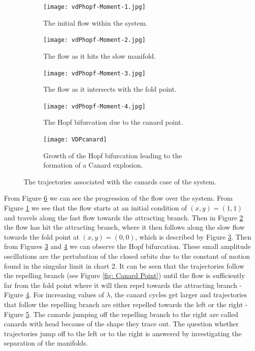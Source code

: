 \begin{figure}[h!]
	\centering
	\begin{subfigure}[t]{0.45\textwidth}
		\centering
		\texttt{[image: vdPhopf-Moment-1.jpg]}
		\caption{The initial flow within the system.} \label{fig:timing1}
	\end{subfigure}
	\hfill
	\begin{subfigure}[t]{0.45\textwidth}
		\centering
		\texttt{[image: vdPhopf-Moment-2.jpg]}
		\caption{The flow as it hits the slow manifold.} \label{fig:timing2}
	\end{subfigure}
	
	\vspace{1cm}
	\begin{subfigure}[t]{0.45\textwidth}
		\centering
		\texttt{[image: vdPhopf-Moment-3.jpg]}
		\caption{The flow as it intersects with the fold point.} \label{fig:timing3}
	\end{subfigure}
	\hfill
	\begin{subfigure}[t]{0.45\textwidth}\centering
		\texttt{[image: vdPhopf-Moment-4.jpg]}
		\caption{The Hopf bifurcation due to the canard point.}\label{fig:timing4}
	\end{subfigure}\vspace{1cm}
	\begin{subfigure}[t]{0.45\textwidth}\centering
		\texttt{[image: VDPcanard]}
		\caption{Growth of the Hopf bifurcation leading to the formation of a Canard explosion.}
		\label{fig: hopf growth}
	\end{subfigure}
	\caption{The trajectories associated with the canards case of the \vdp system.}
	\label{fig: 4 canard }
\end{figure}\newpage
From Figure \ref{fig: 4 canard } we can see the progression of the flow over the system. From Figure \ref{fig:timing1} we see that the flow starts at an initial condition of $ (x,y)=(1,1) $ and travels along the fast flow towards the attracting branch. Then in Figure \ref{fig:timing2} the flow has hit the attracting branch, where it then follows along the slow flow towards the fold point at $ (x,y)=(0,0) $, which is described by Figure \ref{fig:timing3}. Then from Figures \ref{fig:timing3} and \ref{fig:timing4} we can observe the Hopf bifurcation. These small amplitude oscillations are the pertubation of the closed orbits due to the constant of motion found in the singular limit in chart 2.  It can be seen that the trajectories follow the repelling branch (see Figure \ref{fig: Canard Point}) until the flow is sufficiently far from the fold point where it will then repel towards the attracting branch - Figure \ref{fig:timing4}. For increasing values of $\lambda$, the canard cycles get larger and trajectories that follow the repelling branch are either repelled towards the left or the right - Figure \ref{fig: hopf growth}. The canards jumping off the repelling branch to the right are called canards with head because of the shape they trace out.
The question whether trajectories jump off to the left or to the right is answered by investigating the separation of the manifolds.


